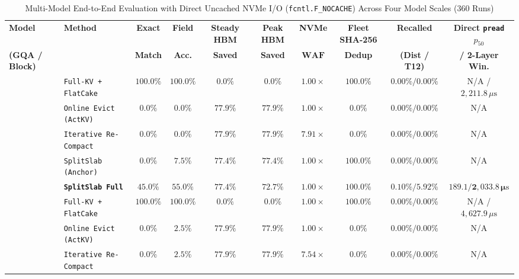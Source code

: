 \documentclass[10pt,journal,compsoc]{IEEEtran}
\theoremstyle{definition}
\theoremstyle{remark}
\newcommand{\WAF}{\operatorname{WAF}}
\begin{document}
\begin{table}[!t]
\centering
\caption{Multi-Model End-to-End Evaluation with Direct Uncached NVMe I/O (\texttt{fcntl.F\_NOCACHE}) Across Four Model Scales ($360$ Runs)}
\label{tab:multimodel}
\footnotesize
\renewcommand{\arraystretch}{1.12}
\setlength{\tabcolsep}{3.0pt}
\begin{tabular}{@{}llcccccccc@{}}
\toprule
\textbf{Model} & \textbf{Method} & \textbf{Exact} & \textbf{Field} & \textbf{Steady HBM} & \textbf{Peak HBM} & \textbf{NVMe} & \textbf{Fleet SHA-256} & \textbf{Recalled} & \textbf{Direct \texttt{pread} $p_{50}$} \\
\textbf{(GQA / Block)} & & \textbf{Match} & \textbf{Acc.} & \textbf{Saved} & \textbf{Saved} & $\mathbf{\WAF}$ & \textbf{Dedup} & \textbf{(Dist / T12)} & \textbf{/ 2-Layer Win.} \\
\midrule
{}
 & \texttt{Full-KV + FlatCake} & $100.0\%$ & $100.0\%$ & $0.0\%$ & $0.0\%$ & $1.00\times$ & $100.0\%$ & $0.00\% / 0.00\%$ & N/A / $2{,}211.8\,\mu\mathrm{s}$ \\
 & \texttt{Online Evict (ActKV)} & $0.0\%$ & $0.0\%$ & $77.9\%$ & $77.9\%$ & $1.00\times$ & $0.0\%$ & $0.00\% / 0.00\%$ & N/A \\
 & \texttt{Iterative Re-Compact} & $0.0\%$ & $0.0\%$ & $77.9\%$ & $77.9\%$ & $7.91\times$ & $0.0\%$ & $0.00\% / 0.00\%$ & N/A \\
 & \texttt{SplitSlab (Anchor)} & $0.0\%$ & $7.5\%$ & $77.4\%$ & $77.4\%$ & $1.00\times$ & $100.0\%$ & $0.00\% / 0.00\%$ & N/A \\
 & \textbf{\texttt{SplitSlab Full}} & $\mathbf{45.0\%}$ & $\mathbf{55.0\%}$ & $\mathbf{77.4\%}$ & $\mathbf{72.7\%}$ & $\mathbf{1.00\times}$ & $\mathbf{100.0\%}$ & $\mathbf{0.10\% / 5.92\%}$ & $\mathbf{189.1 / 2{,}033.8\,\mu\mathrm{s}}$ \\
\midrule
{}
 & \texttt{Full-KV + FlatCake} & $100.0\%$ & $100.0\%$ & $0.0\%$ & $0.0\%$ & $1.00\times$ & $100.0\%$ & $0.00\% / 0.00\%$ & N/A / $4{,}627.9\,\mu\mathrm{s}$ \\
 & \texttt{Online Evict (ActKV)} & $0.0\%$ & $2.5\%$ & $77.9\%$ & $77.9\%$ & $1.00\times$ & $0.0\%$ & $0.00\% / 0.00\%$ & N/A \\
 & \texttt{Iterative Re-Compact} & $0.0\%$ & $2.5\%$ & $77.9\%$ & $77.9\%$ & $7.54\times$ & $0.0\%$ & $0.00\% / 0.00\%$ & N/A \\

\end{tabular}
\end{table}
\end{document}
